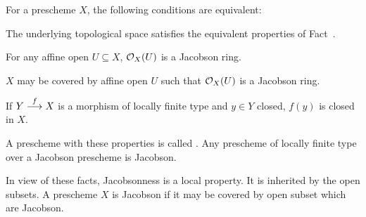 \documentclass[a4paper,parskip=half,numbers=enddot, DIV=12]{scrreprt}
\begin{document}
\begin{defi}
    For a prescheme $X$, the following conditions are equivalent:
    \begin{alphanumerate}
    \item 
        The underlying topological space satisfies the equivalent properties of Fact~.
    \item 
        For any affine open $U\subseteq X$, $\mathcal{O}_X(U)$ is a Jacobson ring.
    \item 
        $X$ may be covered by affine open $U$ such that $\mathcal{O}_X(U)$ is a Jacobson ring.
    \item 
        If $Y\morphism[f] X$ is a morphism of locally finite type and $y\in Y$ closed, $f(y)$ is closed in $X$. 
    \end{alphanumerate}
    A prescheme with these properties is called . Any prescheme of locally finite type over a Jacobson prescheme is Jacobson.
\end{defi}
\begin{rem*}
    In view of these facts, Jacobsonness is a local property. It is inherited by the open subsets. A prescheme $X$ is Jacobson if it may be covered by open subset which are Jacobson.
\end{rem*}
\end{document}
